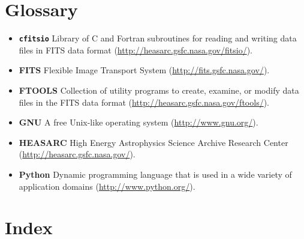 \documentclass{article}[12pt,a4]
\newcommand{\cfitsio}{\mbox{\tt cfitsio}}
\begin{document}
\section{Glossary}
\begin{itemize}
\item[] {\bf \cfitsio}\break
  Library of C and Fortran subroutines for reading and writing data files in FITS data format\break
  (\url{http://heasarc.gsfc.nasa.gov/fitsio/}).
\item[] {\bf FITS\label{gloss:fits}}\break
  Flexible Image Transport System (\url{http://fits.gsfc.nasa.gov/}).
\item[] {\bf FTOOLS}\break
  Collection of utility programs to create, examine, or modify data files in the FITS data format\break
  (\url{http://heasarc.gsfc.nasa.gov/ftools/}).
\item[] {\bf GNU}\break
  A free Unix-like operating system (\url{http://www.gnu.org/}).
\item[] {\bf HEASARC}\break
  High Energy Astrophysics Science Archive Research Center (\url{http://heasarc.gsfc.nasa.gov/}).
\item[] {\bf Python}\break
  Dynamic programming language that is used in a wide variety of application domains\break
  (\url{http://www.python.org/}).
\end{itemize}


\clearpage
\section{Index}
\printindex
\end{document}
